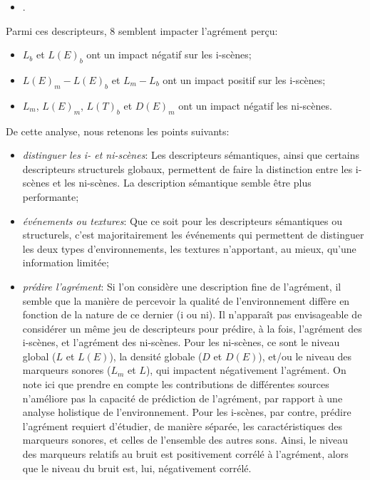 \begin{itemize}
\item {}.
\end{itemize}

Parmi ces descripteurs, 8 semblent impacter l'agrément perçu: 

\begin{itemize}
\item $L_b$ et $L(E)_b$ ont un impact négatif sur les i-scènes;
\item $L(E)_m-L(E)_b$ et $L_m-L_b$ ont un impact positif sur les i-scènes;
\item $L_m$, $L(E)_m$, $L(T)_b$ et $D(E)_m$ ont un impact négatif les ni-scènes.
\end{itemize}

De cette analyse, nous retenons les points suivants:

\begin{itemize}
\item \emph{distinguer les i- et ni-scènes}: Les descripteurs sémantiques, ainsi que certains descripteurs structurels globaux, permettent de faire la distinction entre les i-scènes et les ni-scènes. La description sémantique semble être plus performante;
\item \emph{événements ou textures}: Que ce soit pour les descripteurs sémantiques ou structurels, c'est majoritairement les événements qui permettent de distinguer les deux types d'environnements, les textures n'apportant, au mieux, qu'une information limitée;
\item \emph{prédire l'agrément}: Si l'on considère une description fine de l'agrément, il semble que la manière de percevoir la qualité de l'environnement diffère en fonction de la nature de ce dernier (i ou ni). Il n'apparaît pas envisageable de considérer un même jeu de descripteurs pour prédire, à la fois, l'agrément des i-scènes, et l'agrément des ni-scènes. Pour les ni-scènes, ce sont le niveau global ($L$ et $L(E)$), la densité globale ($D$ et $D(E)$), et/ou le niveau des marqueurs sonores ($L_m$ et $L$), qui impactent négativement l'agrément. On note ici que prendre en compte les contributions de différentes sources n'améliore pas la capacité de prédiction de l'agrément, par rapport à une analyse holistique de l'environnement. Pour les i-scènes, par contre, prédire l'agrément requiert d'étudier, de manière séparée, les caractéristiques des marqueurs sonores, et celles de l'ensemble des autres sons. Ainsi, le niveau des marqueurs relatifs au bruit est positivement corrélé à l'agrément, alors que le niveau du bruit est, lui, négativement corrélé.  
\end{itemize}

